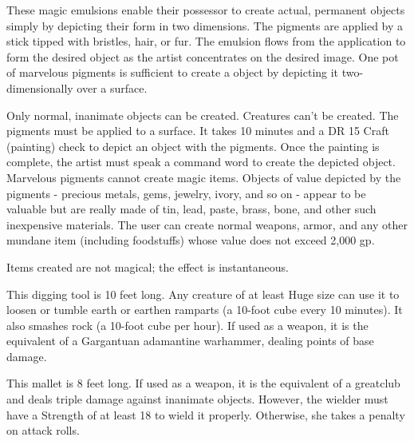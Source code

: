 {

 These magic emulsions enable their possessor to create actual, permanent objects simply by depicting their form in two dimensions. The pigments are applied by a stick tipped with bristles, hair, or fur. The emulsion flows from the application to form the desired object as the artist concentrates on the desired image. One pot of marvelous pigments is sufficient to create a  object by depicting it two-dimensionally over a  surface.

Only normal, inanimate objects can be created. Creatures can't be created. The pigments must be applied to a surface. It takes 10 minutes and a DR 15 Craft (painting) check to depict an object with the pigments. Once the painting is complete, the artist must speak a command word to create the depicted object. Marvelous pigments cannot create magic items. Objects of value depicted by the pigments  - precious metals, gems, jewelry, ivory, and so on -  appear to be valuable but are really made of tin, lead, paste, brass, bone, and other such inexpensive materials. The user can create normal weapons, armor, and any other mundane item (including foodstuffs) whose value does not exceed 2,000 gp.

Items created are not magical; the effect is instantaneous.


 This digging tool is 10 feet long. Any creature of at least Huge size can use it to loosen or tumble earth or earthen ramparts (a 10-foot cube every 10 minutes). It also smashes rock (a 10-foot cube per hour). If used as a weapon, it is the equivalent of a Gargantuan  adamantine warhammer, dealing  points of base damage.


 This mallet is 8 feet long. If used as a weapon, it is the equivalent of a  greatclub and deals triple damage against inanimate objects. However, the wielder must have a Strength of at least 18 to wield it properly. Otherwise, she takes a  penalty on attack rolls.

}
